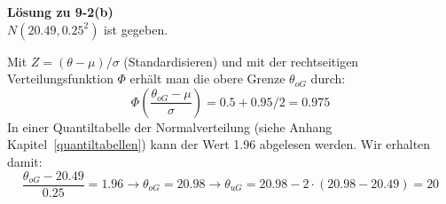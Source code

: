 \textbf{Lösung zu 9-2(b)} \\
$N(20.49,0.25^2)$ ist gegeben.

Mit $Z=(\theta - \mu)/ \sigma$ (Standardisieren) und mit der rechtseitigen Verteilungsfunktion $\Phi$
erhält man die obere Grenze $\theta_{oG}$ durch:
\[
\Phi\left(\frac{\theta_{oG}-\mu}{\sigma}\right) = 0.5 + 0.95/2 = 0.975
\]
In einer Quantiltabelle der Normalverteilung (siehe Anhang Kapitel~\ref{quantiltabellen})
kann der Wert 1.96 abgelesen werden. Wir erhalten damit:
\[
\frac{\theta_{oG}-20.49}{0.25} = 1.96 \rightarrow \theta_{oG} = 20.98
\rightarrow \theta_{uG} = 20.98 - 2 \cdot (20.98-20.49) = 20
\]

